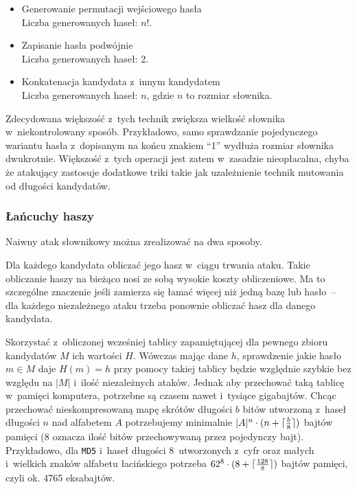 \begin{itemize}
    \item
        Generowanie permutacji wejściowego hasła \\
        Liczba generowanych haseł: $n!$.

    \item
        Zapisanie hasła podwójnie \\
        Liczba generowanych haseł: 2.

    \item
        Konkatenacja kandydata z~innym kandydatem \\
        Liczba generowanych haseł: $n$, gdzie $n$ to rozmiar słownika.

\end{itemize}

Zdecydowana większość z~tych technik zwiększa wielkość słownika
w~niekontrolowany sposób. Przykładowo, samo sprawdzanie pojedynczego wariantu
hasła z~dopisanym na końcu znakiem ``1'' wydłuża rozmiar słownika dwukrotnie.
Większość z~tych operacji jest zatem w~zasadzie nieopłacalna, chyba że
atakujący zastosuje dodatkowe triki takie jak uzależnienie technik mutowania od
długości kandydatów.



\subsubsection{Łańcuchy haszy}
Naiwny atak słownikowy można zrealizować na dwa sposoby.

\begin{myenumerate}

    \item Dla każdego kandydata obliczać jego hasz w~ciągu trwania ataku.
    Takie obliczanie haszy na bieżąco nosi ze sobą wysokie koszty obliczeniowe.
    Ma to szczególne znaczenie jeśli zamierza się łamać więcej niż jedną bazę
    lub hasło~-- dla każdego niezależnego ataku trzeba ponownie obliczać hasz
    dla danego kandydata.

    \item Skorzystać z~obliczonej wcześniej tablicy zapamiętującej dla pewnego
    zbioru kandydatów $M$ ich wartości $H$. Wówczas mając dane $h$, sprawdzenie
    jakie hasło $m \in M$ daje $H(m) = h$ przy pomocy takiej tablicy będzie
    względnie szybkie bez względu na $|M|$ i~ilość niezależnych ataków. Jednak
    aby przechować taką tablicę w~pamięci komputera, potrzebne są czasem nawet
    i~tysiące gigabajtów. Chcąc przechować nieskompresowaną mapę skrótów
    długości $b$ bitów utworzoną z~haseł długości $n$ nad alfabetem $A$
    potrzebujemy minimalnie $|A|^n \cdot (n + \lceil\frac{b}{8}\rceil)$ bajtów
    pamięci (8 oznacza ilość bitów przechowywaną przez pojedynczy bajt).
    Przykładowo, dla \texttt{MD5} i~haseł długości 8~utworzonych z~cyfr oraz
    małych i~wielkich znaków alfabetu łacińskiego potrzeba $62^8 \cdot (8 +
    \lceil\frac{128}{8}\rceil)$ bajtów pamięci, czyli ok. 4765 eksabajtów.

\end{myenumerate}

